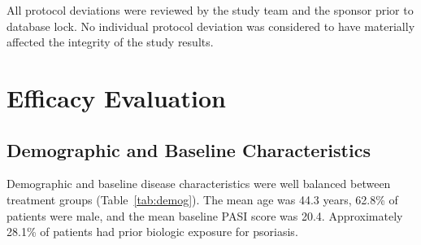 \documentclass[11pt, a4paper]{article}
\begin{document}
\vspace{4pt}
All protocol deviations were reviewed by the study team and the sponsor prior to database lock. No individual protocol deviation was considered to have materially affected the integrity of the study results.

\newpage

\section{Efficacy Evaluation}

\subsection{Demographic and Baseline Characteristics}

Demographic and baseline disease characteristics were well balanced between treatment groups (Table~\ref{tab:demog}). The mean age was 44.3 years, 62.8\% of patients were male, and the mean baseline PASI score was 20.4. Approximately 28.1\% of patients had prior biologic exposure for psoriasis.
\end{document}
